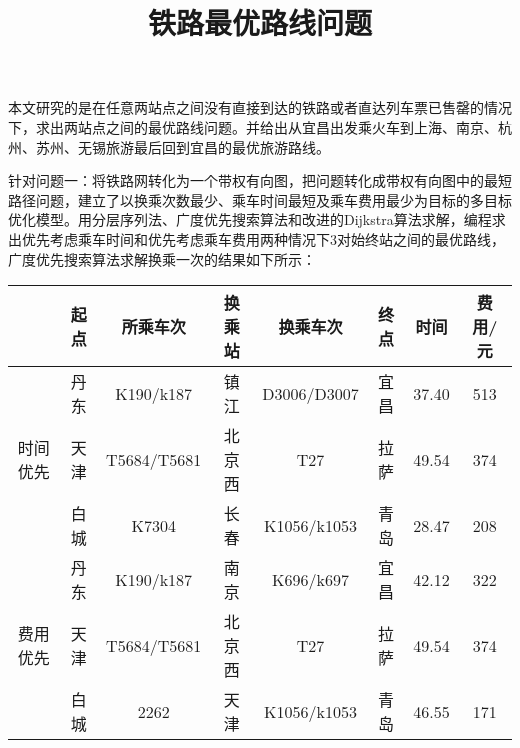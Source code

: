 \documentclass[nocover]{cumcmart}%
\begin{document}
\title{铁路最优路线问题}




\maketitle
\begin{cnabstract}

本文研究的是在任意两站点之间没有直接到达的铁路或者直达列车票已售罄的情况下，求出两站点之间的最优路线问题。并给出从宜昌出发乘火车到上海、南京、杭州、苏州、无锡旅游最后回到宜昌的最优旅游路线。

针对问题一：将铁路网转化为一个带权有向图，把问题转化成带权有向图中的最短路径问题，建立了以换乘次数最少、乘车时间最短及乘车费用最少为目标的多目标优化模型。用分层序列法、广度优先搜索算法和改进的Dijkstra算法求解，编程求出优先考虑乘车时间和优先考虑乘车费用两种情况下3对始终站之间的最优路线，广度优先搜索算法求解换乘一次的结果如下所示：

\begin{table}[h]
\centering
\begin{tabular}{|c|c|c|c|c|c|c|c|}
\hline
 & 起点                     & 所乘车次 & 换乘站         & 换乘车次 & 终点          & 时间 & 费用/元       \\ \hline
\multirow{3}{*}{时间优先} & 丹东   & K190/k187   & 镇江   & D3006/D3007 & 宜昌 & 37.40 & 513 \\ \cline{2-8} 
                       & 天津   & T5684/T5681 & 北京西  & T27         & 拉萨 & 49.54 & 374 \\ \cline{2-8} 
                       & 白城   & K7304       & 长春   & K1056/k1053 & 青岛 & 28.47 & 208 \\ \hline
\multirow{3}{*}{费用优先} & 丹东   & K190/k187   & 南京   & K696/k697   & 宜昌 & 42.12 & 322 \\ \cline{2-8} 
                       & 天津   & T5684/T5681 & 北京西  & T27         & 拉萨 & 49.54 & 374 \\ \cline{2-8} 
                       & 白城   & 2262        & 天津   & K1056/k1053 & 青岛 & 46.55 & 171 \\ \hline
\end{tabular}
\end{table}


\end{cnabstract}
\end{document}
